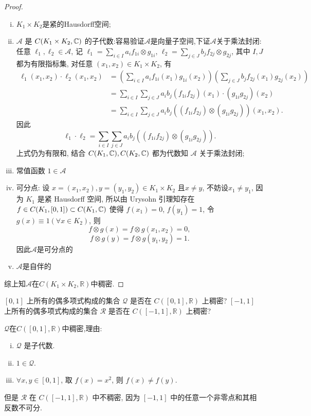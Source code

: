 \begin{proof}
  \begin{enumerate}[(i)]
    \item $K_1\times K_2$是紧的Hausdorff空间;
    \item $\mathcal{A}$ 是 $C(K_1\times K_2,\mathbb{C})$ 的子代数:容易验证$\mathcal{A}$是向量子空间,下证$\mathcal{A}$关于乘法封闭:\\
    任意 $\ell_1,\ell_2\in\mathcal{A}$, 记 $\ell_1=\sum_{i\in I}a_if_{1i}\otimes g_{1i}$,
    $\ell_2=\sum_{j\in J}b_jf_{2j}\otimes g_{2j}$, 其中 $I,J$ 都为有限指标集,
    对任意 $(x_1,x_2)\in K_1\times K_2$, 有
    \[\begin{split}
      \ell_1(x_1,x_2)\cdot\ell_2(x_1,x_2)
      & = \left(\sum_{i\in I}a_if_{1i}(x_1)g_{1i}(x_2)\right)
          \left(\sum_{j\in J}b_jf_{2j}(x_1)g_{2j}(x_2)\right) \\
      & = \sum_{i\in I}\sum_{j\in J}a_ib_j(f_{1i}f_{2j})(x_1)\cdot(g_{1i}g_{2j})(x_2) \\
      & = \sum_{i\in I}\sum_{j\in J}a_ib_j\left((f_{1i}f_{2j})\otimes(g_{1i}g_{2j})\right)(x_1,x_2).
    \end{split}\]
    因此
    \[\ell_1\cdot\ell_2
      = \sum_{i\in I}\sum_{j\in J}a_ib_j\left((f_{1i}f_{2j})\otimes(g_{1i}g_{2j})\right).\]
    上式仍为有限和, 结合 $C(K_1,\mathbb{C}),C(K_2,\mathbb{C})$ 都为代数知 $\mathcal{A}$ 关于乘法封闭;
    \item 常值函数 $1\in\mathcal{A}$
    \item 可分点: 设 $x=(x_1,x_2),y=(y_1,y_2)\in K_1\times K_2$ 且$x\neq y$, 不妨设$x_1\neq y_1$,
      因为 $K_1$ 是紧 Hausdorff 空间, 所以由 Urysohn 引理知存在 $f\in C(K_1,[0,1])\subset C(K_1,\mathbb{C})$
      使得 $f(x_1)=0$, $f(y_1)=1$, 令 $g(x)\equiv1(\forall x\in K_2)$, 则
      \[f\otimes g(x)=f\otimes g(x_1,x_2)=0,\]
      \[f\otimes g(y)=f\otimes g(y_1,y_2)=1.\]
      因此$\mathcal{A}$是可分点的
    \item $\mathcal{A}$是自伴的
  \end{enumerate}
  综上知$\mathcal{A}$在$C(K_1\times K_2,\mathbb{R})$中稠密.
\end{proof}



\begin{exercise}
    $[0,1]$ 上所有的偶多项式构成的集合 $\mathcal{Q}$ 是否在 $C([0,1], \mathbb{R})$ 上稠密?
    $[-1,1]$ 上所有的偶多项式构成的集合 $\mathcal{R}$ 是否在 $C([-1,1], \mathbb{R})$ 上稠密?
\end{exercise}

\begin{solution}
    $\mathcal{Q}$在$C([0,1],\mathbb{R})$中稠密,理由:
    \begin{enumerate}[(i)]
    \item $\mathcal{Q}$ 是子代数.
    \item $1\in\mathcal{Q}$.
    \item $\forall x,y\in [0,1]$, 取 $f(x)=x^2$, 则 $f(x)\neq f(y)$.
    \end{enumerate}
    但是 $\mathcal{R}$ 在 $C([-1,1],\mathbb{R})$ 中不稠密, 因为 $[-1,1]$ 中的任意一个非零点和其相反数不可分.
\end{solution}



